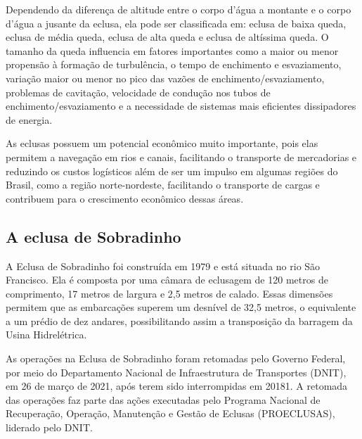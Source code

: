 Dependendo da diferença de altitude entre o corpo d’água a montante e o corpo d’água a jusante da eclusa, ela pode ser classificada em: eclusa de baixa queda, eclusa de média queda, eclusa de alta queda e eclusa de altíssima queda. O tamanho da queda influencia em fatores importantes como a maior ou menor propensão à formação de turbulência, o tempo de enchimento e esvaziamento, variação maior ou menor no pico das vazões de enchimento/esvaziamento, problemas de cavitação, velocidade de condução nos tubos de enchimento/esvaziamento e a necessidade de sistemas mais eficientes dissipadores de energia.

As eclusas possuem um potencial econômico muito importante, pois elas permitem a navegação em rios e canais, facilitando o transporte de mercadorias e reduzindo os custos logísticos além de ser um impulso em algumas regiões do Brasil, como a região norte-nordeste, facilitando o transporte de cargas e contribuem para o crescimento econômico dessas áreas.


\subsection{A eclusa de Sobradinho}

A Eclusa de Sobradinho foi construída em 1979 e está situada no rio São Francisco. Ela é composta por uma câmara de eclusagem de 120 metros de comprimento, 17 metros de largura e 2,5 metros de calado. Essas dimensões permitem que as embarcações superem um desnível de 32,5 metros, o equivalente a um prédio de dez andares, possibilitando assim a transposição da barragem da Usina Hidrelétrica\cite{Eninfra}.

As operações na Eclusa de Sobradinho foram retomadas pelo Governo Federal, por meio do Departamento Nacional de Infraestrutura de Transportes (DNIT), em 26 de março de 2021, após terem sido interrompidas em 20181. A retomada das operações faz parte das ações executadas pelo Programa Nacional de Recuperação, Operação, Manutenção e Gestão de Eclusas (PROECLUSAS), liderado pelo DNIT.

